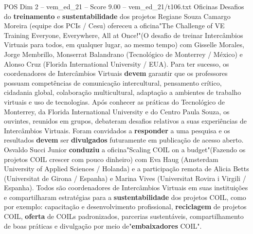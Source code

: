 \begin{textsample}{POS Dim 2 – vem\_ed\_21 – Score 9.00 – vem\_ed\_21/t106.txt}  \label{ex:f2_pos_167}
Oficinas Desafios do \textbf{treinamento} e \textbf{sustentabilidade} dos projetos Regiane Souza Camargo Moreira (equipe dos PCIs / Cesu) ofereceu a oficina"The Challenge of VE Training Everyone, Everywhere, All at Once!"(O desafio de treinar Intercâmbios Virtuais para todos, em qualquer lugar, ao mesmo tempo) com Gisselle Morales, Jorge Membrillo, Monserrat Balandrano (Tecnológico de Monterrey / México) e Alonso Cruz (Florida International University / EUA).
Para ter sucesso, os coordenadores de Intercâmbios Virtuais \textbf{devem} garantir que os professores possuam competências de comunicação intercultural, pensamento crítico, cidadania global, colaboração multicultural, adaptação a ambientes de trabalho virtuais e uso de tecnologias.
Após conhecer as práticas do Tecnológico de Monterrey, da Florida International University e do Centro Paula Souza, os ouvintes, reunidos em grupos, debateram desafios relativos a suas experiências de Intercâmbios Virtuais.
Foram convidados a \textbf{responder} a uma pesquisa e os resultados \textbf{devem} ser \textbf{divulgados} futuramente em publicação de acesso aberto.
Osvaldo Succi Junior \textbf{conduziu} a oficina"Scaling COIL on a budget"(Fazendo os projetos COIL crescer com pouco dinheiro) com Eva Haug (Amsterdam University of Applied Sciences / Holanda) e a participação remota de Alicia Betts (Universitat de Girona / Espanha) e Marina Vives (Universitat Rovira i Virgili / Espanha).
Todos são coordenadores de Intercâmbios Virtuais em suas instituições e compartilharam estratégias para a \textbf{sustentabilidade} dos projetos COIL, como por exemplo: capacitação e desenvolvimento profissional, \textbf{reciclagem} de projetos COIL, \textbf{oferta} de COILs padronizados, parcerias sustentáveis, compartilhamento de boas práticas e divulgação por meio de"\textbf{embaixadores} COIL".

\end{textsample}
